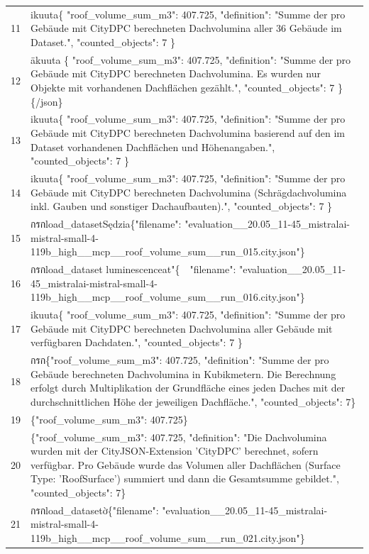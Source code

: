\documentclass[a4paper,11pt]{article}
\begin{document}
\begin{table}[ht]
\begin{tabular}{r p{12cm}}
11 & ikuuta\{
  "roof\_volume\_sum\_m3": 407.725,
  "definition": "Summe der pro Gebäude mit CityDPC berechneten Dachvolumina aller 36 Gebäude im Dataset.",
  "counted\_objects": 7
\} \\
12 & äkuuta
\{
  "roof\_volume\_sum\_m3": 407.725,
  "definition": "Summe der pro Gebäude mit CityDPC berechneten Dachvolumina. Es wurden nur Objekte mit vorhandenen Dachflächen gezählt.",
  "counted\_objects": 7
\}
\{/json\} \\
13 & ikuuta\{
  "roof\_volume\_sum\_m3": 407.725,
  "definition": "Summe der pro Gebäude mit CityDPC berechneten Dachvolumina basierend auf den im Dataset vorhandenen Dachflächen und Höhenangaben.",
  "counted\_objects": 7
\} \\
14 & ikuuta\{
  "roof\_volume\_sum\_m3": 407.725,
  "definition": "Summe der pro Gebäude mit CityDPC berechneten Dachvolumina (Schrägdachvolumina inkl. Gauben und sonstiger Dachaufbauten).",
  "counted\_objects": 7
\} \\
15 &  กรกload\_datasetSędzia\{"filename": "evaluation\_\_20.05\_11-45\_mistralai-mistral-small-4-119b\_high\_\_mcp\_\_roof\_volume\_sum\_\_run\_015.city.json"\} \\
16 &  กรกload\_dataset luminescenceat"\{ "filename": "evaluation\_\_20.05\_11-45\_mistralai-mistral-small-4-119b\_high\_\_mcp\_\_roof\_volume\_sum\_\_run\_016.city.json"\} \\
17 & ikuuta\{
  "roof\_volume\_sum\_m3": 407.725,
  "definition": "Summe der pro Gebäude mit CityDPC berechneten Dachvolumina aller Gebäude mit verfügbaren Dachdaten.",
  "counted\_objects": 7
\} \\
18 &  กรก\{"roof\_volume\_sum\_m3": 407.725, "definition": "Summe der pro Gebäude berechneten Dachvolumina in Kubikmetern. Die Berechnung erfolgt durch Multiplikation der Grundfläche eines jeden Daches mit der durchschnittlichen Höhe der jeweiligen Dachfläche.", "counted\_objects": 7\} \\
19 & \{"roof\_volume\_sum\_m3": 407.725\} \\
20 & \{"roof\_volume\_sum\_m3": 407.725, "definition": "Die Dachvolumina wurden mit der CityJSON-Extension 'CityDPC' berechnet, sofern verfügbar. Pro Gebäude wurde das Volumen aller Dachflächen (Surface Type: 'RoofSurface') summiert und dann die Gesamtsumme gebildet.", "counted\_objects": 7\} \\
21 &  กรกload\_datasetờ\{"filename": "evaluation\_\_20.05\_11-45\_mistralai-mistral-small-4-119b\_high\_\_mcp\_\_roof\_volume\_sum\_\_run\_021.city.json"\} \\

\end{tabular}
\end{table}
\end{document}
